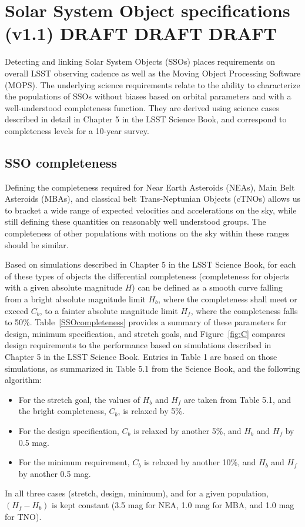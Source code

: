 \documentclass[manuscript]{aastex}
\begin{document}
\section{Solar System Object specifications (v1.1) DRAFT DRAFT DRAFT}

Detecting and linking Solar System Objects (SSOs) places requirements on overall LSST observing cadence as well 
as the Moving Object Processing Software (MOPS). The underlying science requirements relate to the ability to 
characterize the populations of  SSOs without biases based on orbital parameters and with a well-understood 
completeness function. They are derived using science cases described in detail in Chapter 5 in the LSST Science 
Book, and correspond to completeness levels for a 10-year survey. 

\subsection{SSO completeness}

Defining the completeness required for Near Earth Asteroids (NEAs), Main Belt Asteroids (MBAs), and classical belt Trans-Neptunian Objects (cTNOs) allows us to bracket a wide range of expected velocities and accelerations on the sky, while still defining these quantities on reasonably well understood groups. The completeness of other populations with motions on the sky within these ranges should be similar. 

Based on simulations described in Chapter 5 in the LSST Science Book, for each of these types of objects the 
differential completeness (completeness for objects with a given absolute magnitude $H$) 
can be defined as a smooth curve falling from a bright absolute magnitude limit $H_b$, where the completeness shall meet or exceed $C_b$, to a fainter absolute magnitude limit $H_f$,  where the completeness falls to 50\%. Table~\ref{SSOcompleteness} provides a summary of these parameters for design, minimum specification, and stretch goals, and Figure~\ref{fig:C} compares design requirements
to the performance based on simulations described in Chapter 5 in the LSST Science Book. 
Entries in Table 1 are based on those simulations, as summarized in Table 5.1 from the Science Book, 
and the following algorithm:
\begin{itemize}
\item For the stretch goal, the values of $H_b$ and $H_f$ are taken from Table 5.1, and the bright completeness, 
$C_b$, is relaxed by 5\%.
\item For the design specification, $C_b$ is relaxed by another 5\%, and $H_b$ and $H_f$ by 0.5 mag. 
\item For the minimum requirement, $C_b$ is relaxed by another 10\%, and $H_b$ and $H_f$ by another 0.5 mag. 
\end{itemize}
In all three cases (stretch, design, minimum), and for a given population, $(H_f-H_b)$ is kept constant 
(3.5 mag for NEA, 1.0 mag for MBA, and 1.0 mag for TNO). 
\end{document}
